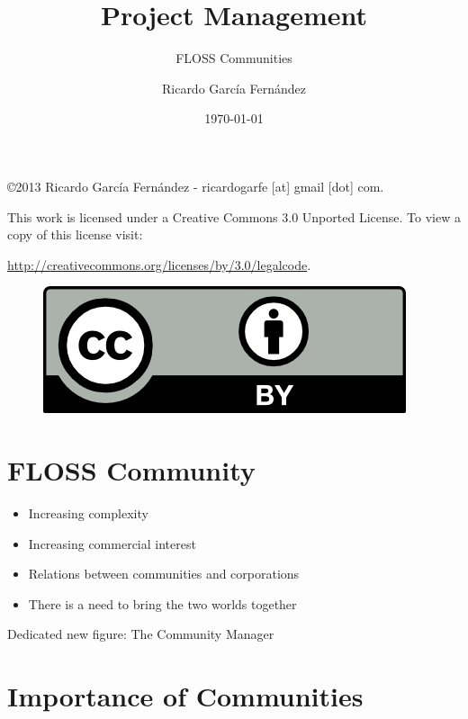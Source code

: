 \documentclass[11pt]{scrartcl}
\title{\textbf{Project Management}}
\subtitle{FLOSS Communities}
\author{Ricardo Garc\'ia Fern\'andez}
\date{\today}
\begin{document}
\maketitle

\vfill

\begin{flushright}
    \copyright  2013 Ricardo Garc\'ia Fern\'andez - ricardogarfe [at] gmail [dot] com.

    This work is licensed under a Creative Commons 3.0 Unported License.
    To view a copy of this license visit:
 
    \url{http://creativecommons.org/licenses/by/3.0/legalcode}.
\end{flushright}

\begin{figure}[h]
    \begin{flushright}	
        \includegraphics{by}
        \label{fig:by}
    \end{flushright}
\end{figure}

\newpage

\section{FLOSS Community}

\begin{itemize}
	\item Increasing complexity
	\item Increasing commercial interest
	\item Relations between communities and corporations
	\item There is a need to bring the two worlds together
\end{itemize}

\par Dedicated new figure: The Community Manager

\section{Importance of Communities}
\label{sec:importance}
\end{document}
